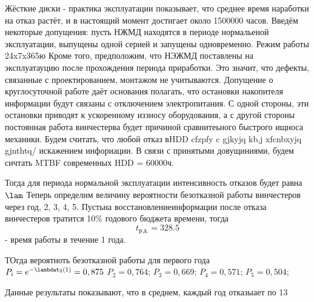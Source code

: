 \documentclass[a4paper, 12pt]{extarticle}
\begin{document}
	Жёсткие диски - практика эксплуатации показывает, что среднее время наработки на отказ растёт, и в настоящий момент достигает около 1500000 часов. Введём некоторые допущения: пусть НЖМД находятся в периоде нормальеной эксплуатации, выпущены одной серией и запущены одновременно. Режим работы 24x7x365ю Кроме того, предположим, что НЭЖМД поставлены на эксплуатауцию после прохождения периода приработки. Это значит, что дефекты, связанные с проектированием, монтажом не учитываются. Допущение о круглосуточной работе даёт основания полагать, что остановки накопителя информации будут связаны с отключением электропитания. С одной стороны, эти остановки приводят к ускоренному иззносу оборудования, а с другой стороны постоянная работа винчестерва будет причиной сравнитеьного быстрого ищноса механики. Будем считать, что любой отказ вHDD cfzpfy c gjkyjq kb,j xfcnbxyjq gjnthtq/ искажением инфориации. В связи с принятыми довущиниями, будем сичтать MTBF современных HDD = 60000ч.

	Тогда для периода нормальной эксплуатации интенсивность отказов будет равна $\lam$
	Теперь определим величину вероятности безотказной работы винчестеров через год, 2, 3, 4, 5. Пустьна восстановлениеинформации после отказа винчестеров тратится 10\% годового бюджета времени, тогда $$t_{р.д.} = 328.5$$ - время работы в течение 1 года.

	ТОгда вероятноть безотказной работы для первого года $P_i = e^{-\lambdat_2(1)} = 0,875$
	$P_2 = 0,764$;
	$P_3 = 0,669$;
	$P_4 = 0,571$;
	$P_5 = 0,504$;

	Данные результаты показывают, что в среднем, каждый год отказыает по 13%
\end{document}
